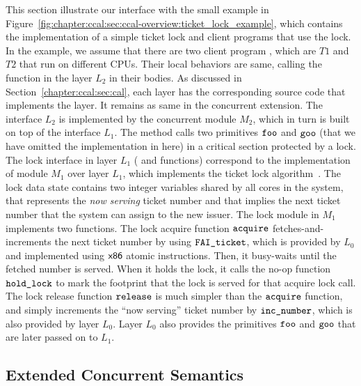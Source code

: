 This section illustrate our interface with the small example in Figure~\ref{fig:chapter:ccal:sec:ccal-overview:ticket_lock_example},
which contains the implementation of a simple ticket lock and client programs that use the lock.
In the example, we assume that
there are two client program , which are $T1$ and $T2$  that run on different CPUs.
Their local behaviors are same, calling the  function in the layer $L_2$ in their bodies. 
As discussed in Section~\ref{chapter:ccal:sec:cal}, each layer has the corresponding source code that implements the layer. 
It remains as same in the concurrent extension. 
The interface
$L_2$ is implemented by the concurrent module $M_2$, which in
turn is built on top of the interface $L_1$. The method 
calls two primitives ${\mathrm{\texttt{foo}}}$ and ${\mathrm{\texttt{goo}}}$ (that we have omitted the implementation in here) in a critical section
protected by a lock.  
The lock interface in layer $L_1$ ( and  functions) 
correspond to the implementation of module $M_1$ over layer $L_1$, which implements the ticket lock algorithm~\cite{mcs91}.
The lock data state contains two integer variables shared by all cores in the system, 
 that represents the \textit{now serving} ticket number and  that implies the next ticket number that the system can assign to the new issuer. 
The lock module in $M_1$ implements two functions. 
The lock acquire function ${\mathrm{\texttt{acquire}}}$ fetches-and-increments the next ticket number by using ${\mathrm{\texttt{FAI\_ticket}}}$,
which is provided by $L_0$ and implemented using  $\mathsf{x86}$ atomic instructions.
Then, it busy-waits until the fetched number is served. 
When it holds the lock, it calls the no-op function ${\mathrm{\texttt{hold\_lock}}}$ to mark the footprint that the lock is served for that acquire lock call.
The lock release function ${\mathrm{\texttt{release}}}$ is much simpler than the  ${\mathrm{\texttt{acquire}}}$ function, and 
simply increments the ``now serving'' ticket number by ${\mathrm{\texttt{inc\_number}}}$, which 
is also provided by layer $L_0$.
Layer $L_0$ also provides the primitives ${\mathrm{\texttt{foo}}}$ and ${\mathrm{\texttt{goo}}}$ that are later passed on to $L_1$.


\subsection{Extended Concurrent Semantics}
\label{chapter:ccal:subsec:extended-concurrent-semantics}

